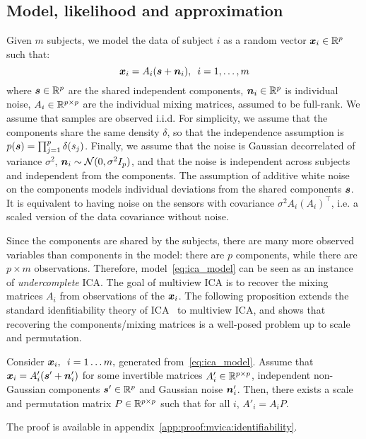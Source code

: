 \subsection{Model, likelihood and approximation}
%
Given $m$ subjects, we model the data of subject $i$ as a random vector
$\boldsymbol{x}_i\in\mathbb{R}^p$  such that:
\begin{equation}
\label{eq:ica_model}
    \boldsymbol{x}_i = A_i(\boldsymbol{s} + \boldsymbol{n}_i), \enspace i=1,\dots, m
\end{equation}
where $\boldsymbol{s} \in \mathbb{R}^p$ are the shared independent components, $\boldsymbol{n}_i \in \mathbb{R}^p$ is individual noise, $A_i \in \mathbb{R}^{p\times p}$ are the individual mixing matrices, assumed to be full-rank.
%
We assume that samples are observed i.i.d. For simplicity, we assume that the components share the same density $\delta$, so that the independence assumption is $p(\boldsymbol{s}) = \prod_{j=1}^p \delta(s_j)$. Finally, we assume that the noise is Gaussian decorrelated of variance $\sigma^2$, $\boldsymbol{n}_i \sim \mathcal{N}(0, \sigma^2I_p)$, and that the noise is independent across subjects and independent from the components.
The assumption of additive white noise on the components models individual deviations from the shared components $\boldsymbol{s}$.
It is equivalent to having noise on the sensors with covariance $\sigma^2 A_i \left(A_i\right)^{\top}$, i.e. a scaled version of the data covariance without noise.

Since the components are shared by the subjects, there are many more observed variables than components in the model: there are $p$ components, while there are $p \times m$ observations.
%
Therefore, model~\eqref{eq:ica_model} can be seen as an instance of \emph{undercomplete} ICA.
%
The goal of multiview ICA is to recover the mixing matrices $A_i$ from observations of the $\boldsymbol{x}_i$.
%
The following proposition extends the standard idenfitiability theory of ICA~\cite{comon1994independent} to multiview ICA, and shows that recovering the components/mixing matrices is a well-posed problem up to scale and permutation.
%
\begin{proposition}
\label{prop:identifiability}
Consider $\boldsymbol{x}_i, \enspace i=1\dots m,$ generated from~\eqref{eq:ica_model}. Assume that $\boldsymbol{x}_i = A'_i(\boldsymbol{s}' + \boldsymbol{n}'_i)$ for some invertible matrices $A'_i\in \mathbb{R}^{p\times p}$, independent non-Gaussian components $\boldsymbol{s}'\in \mathbb{R}^p$ and Gaussian noise $\boldsymbol{n}'_i$. Then, there exists a scale and permutation matrix $P\in \mathbb{R}^{p\times p}$ such that for all $i$, $A'_i = A_i P$.
\end{proposition}
The proof is available in appendix~\ref{app:proof:mvica:identifiability}.

